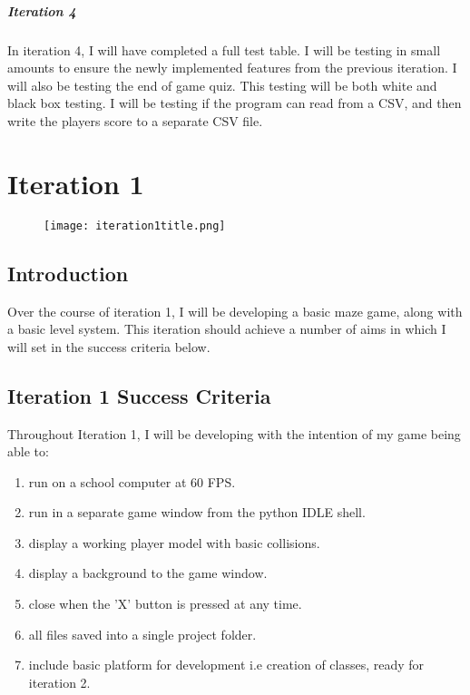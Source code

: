 \documentclass[12pt]{report}
\begin{document}
\paragraph{Iteration 4}
In iteration 4, I will have completed a full test table. I will be testing in small amounts to ensure the newly implemented features from the previous iteration. I will also be testing the end of game quiz. This testing will be both white and black box testing. I will be testing if the program can read from a CSV, and then write the players score to a separate CSV file.

\pagebreak

\chapter{Iteration 1}

\begin{figure}[h]
    \centering
    \texttt{[image: iteration1title.png]}
    \label{iteration1title}
\end{figure}

\pagebreak

\section{Introduction}
Over the course of iteration 1, I will be developing a basic maze game, along with a basic level system. This iteration should achieve a number of aims in which I will set in the success criteria below.

\section{Iteration 1 Success Criteria}
Throughout Iteration 1, I will be developing with the intention of my game being able to:

\begin{enumerate}
    \item run on a school computer at 60 FPS.
    \item run in a separate game window from the python IDLE shell.
    \item display a working player model with basic collisions.
    \item display a background to the game window.
    \item close when the 'X' button is pressed at any time.
    \item all files saved into a single project folder.
    \item include basic platform for development i.e creation of classes, ready for iteration 2.
\end{enumerate}
\end{document}

